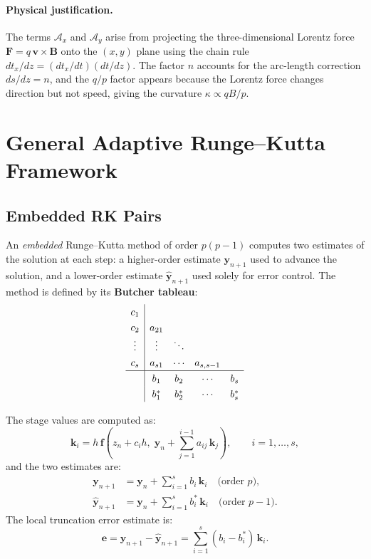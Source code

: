 \documentclass[11pt,a4paper]{article}
\newcommand{\bvec}[1]{\mathbf{#1}}
\begin{document}
\paragraph{Physical justification.}
The terms $\mathcal{A}_x$ and $\mathcal{A}_y$ arise from projecting the
three-dimensional Lorentz force $\bvec{F} = q\,\bvec{v}\times\bvec{B}$ onto
the $(x,y)$ plane using the chain rule $dt_x/dz = (dt_x/dt)(dt/dz)$. The
factor $n$ accounts for the arc-length correction $ds/dz = n$, and the $q/p$
factor appears because the Lorentz force changes direction but not speed,
giving the curvature $\kappa \propto q B / p$.


\section{General Adaptive Runge--Kutta Framework}\label{sec:rk}

\subsection{Embedded RK Pairs}

An \textit{embedded} Runge--Kutta method of order $p(p-1)$ computes two
estimates of the solution at each step: a higher-order estimate $\bvec{y}_{n+1}$
used to advance the solution, and a lower-order estimate
$\hat{\bvec{y}}_{n+1}$ used solely for error control. The method is defined by
its \textbf{Butcher tableau}:
\begin{equation}
  \renewcommand{\arraystretch}{1.3}
  \begin{array}{c|cccc}
    c_1    & & & & \\
    c_2    & a_{21} & & & \\
    \vdots & \vdots & \ddots & & \\
    c_s    & a_{s1} & \cdots & a_{s,s-1} & \\
    \hline
           & b_1 & b_2 & \cdots & b_s \\
           & b^*_1 & b^*_2 & \cdots & b^*_s
  \end{array}
\end{equation}

The stage values are computed as:
\begin{equation}\label{eq:rk-stages}
  \bvec{k}_i = h\,\bvec{f}\!\left(z_n + c_i h,\;\bvec{y}_n + \sum_{j=1}^{i-1} a_{ij}\,\bvec{k}_j\right),
  \qquad i = 1,\ldots,s,
\end{equation}
and the two estimates are:
\begin{align}
  \bvec{y}_{n+1} &= \bvec{y}_n + \sum_{i=1}^{s} b_i\,\bvec{k}_i \quad\text{(order $p$)}, \label{eq:rk-update}\\
  \hat{\bvec{y}}_{n+1} &= \bvec{y}_n + \sum_{i=1}^{s} b^*_i\,\bvec{k}_i \quad\text{(order $p-1$)}.
\end{align}
The local truncation error estimate is:
\begin{equation}\label{eq:rk-error}
  \bvec{e} = \bvec{y}_{n+1} - \hat{\bvec{y}}_{n+1} = \sum_{i=1}^{s}(b_i - b^*_i)\,\bvec{k}_i.
\end{equation}
\end{document}
